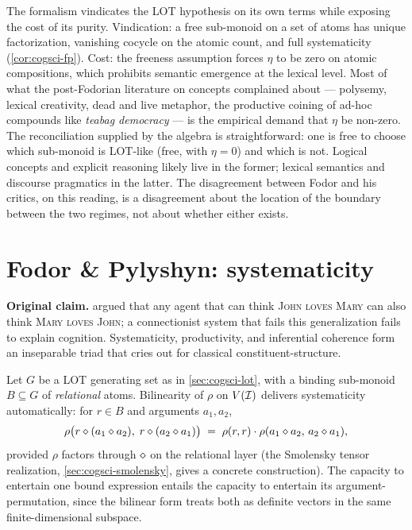 \litcomment The formalism vindicates the LOT hypothesis on its own terms
while exposing the cost of its purity. Vindication: a free sub-monoid
on a set of atoms has unique factorization, vanishing cocycle on the
atomic count, and full systematicity (\cref{cor:cogsci-fp}). Cost: the
freeness assumption forces $\eta$ to be zero on atomic compositions,
which prohibits semantic emergence at the lexical level. Most of what
the post-Fodorian literature on concepts complained about --- polysemy,
lexical creativity, dead and live metaphor, the productive coining of
ad-hoc compounds like \emph{teabag democracy} --- is the empirical
demand that $\eta$ be non-zero. The reconciliation supplied by the
algebra is straightforward: one is free to choose which sub-monoid is
LOT-like (free, with $\eta=0$) and which is not. Logical concepts and
explicit reasoning likely live in the former; lexical semantics and
discourse pragmatics in the latter. The disagreement between Fodor and
his critics, on this reading, is a disagreement about the location of
the boundary between the two regimes, not about whether either exists.

\section{Fodor \& Pylyshyn: systematicity}\label{sec:cogsci-systematicity}

\textbf{Original claim.} \citet{FodorPylyshyn1988} argued that any agent
that can think \textsc{John loves Mary} can also think \textsc{Mary loves
John}; a connectionist system that fails this generalization fails to
explain cognition. Systematicity, productivity, and inferential coherence
form an inseparable triad that cries out for classical
constituent-structure.

\formalclaim Let $G$ be a LOT generating set as in
\cref{sec:cogsci-lot}, with a binding sub-monoid $B\subseteq G$ of
\emph{relational} atoms. Bilinearity of $\rho$ on $V(\mathcal{I})$ delivers
systematicity automatically: for $r\in B$ and arguments $a_1,a_2$,
\[
  \rho\bigl(r\mathbin{\diamond}(a_1\mathbin{\diamond} a_2),\;r\mathbin{\diamond}(a_2\mathbin{\diamond} a_1)\bigr)
  \;=\;\rho(r,r)\cdot\rho(a_1\mathbin{\diamond} a_2,\,a_2\mathbin{\diamond} a_1),
\]
provided $\rho$ factors through $\mathbin{\diamond}$ on the relational layer (the
Smolensky tensor realization, \cref{sec:cogsci-smolensky}, gives a concrete
construction). The capacity to entertain one bound expression entails the
capacity to entertain its argument-permutation, since the bilinear form
treats both as definite vectors in the same finite-dimensional subspace.

